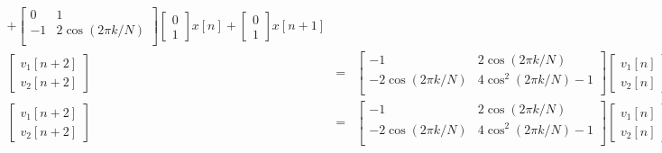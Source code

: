 \begin{eqnarray}
+
\left[
\begin{array}{cc}
0 & 1 \\
-1 & 2\cos(2\pi k/N)  \\
\end{array}
\right]
\left[
\begin{array}{c}
0\\
1
\end{array}
\right]
x[n]
+
\left[
\begin{array}{cc}
0\\
1
\end{array}
\right]
x[n+1]
\\
\left[
\begin{array}{c}
v_{1}[n+2] \\
v_{2}[n+2]
\end{array} 
\right]
 & = &
\left[
\begin{array}{cc}
-1 & 2\cos(2\pi k/N)\\
-2\cos(2\pi k/N) & 4\cos^2(2\pi k/N)-1 \\
\end{array}
\right]
\left[
\begin{array}{c}
v_{1}[n] \\
v_{2}[n]
\end{array}
\right]
+
\left[
\begin{array}{c}
1 \\
2\cos(2\pi k/N) \\
\end{array}
\right]
x[n]
+
\left[
\begin{array}{cc}
0\\
1
\end{array}
\right]
x[n+1]
\\
\left[
\begin{array}{c}
v_{1}[n+2] \\
v_{2}[n+2]
\end{array} 
\right]
 & = &
\left[
\begin{array}{cc}
-1 & 2\cos(2\pi k/N)\\
-2\cos(2\pi k/N) & 4\cos^2(2\pi k/N)-1 \\
\end{array}
\right]
\left[
\begin{array}{c}
v_{1}[n] \\
v_{2}[n]
\end{array}
\right]
+
\left[
\begin{array}{cc}
1 & 0\\
2\cos(2\pi k/N) & 1
\end{array}
\right]
\left[
\begin{array}{c}
x[n] \\
x[n+1]
\end{array}
\right]
\end{eqnarray}